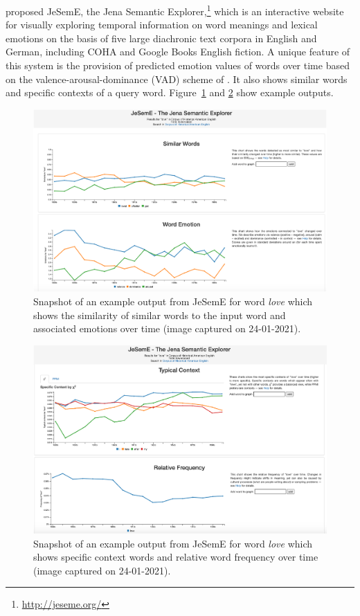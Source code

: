 \documentclass[output=paper%
]{langsci/langscibook}
\begin{document}
\citet{jeseme} proposed JeSemE, the Jena Semantic Explorer,\footnote{\url{http://jeseme.org/}} which is an interactive website for visually exploring temporal information on word meanings and lexical emotions on the basis of five large diachronic text corpora in English and German, including COHA and Google Books English fiction. A unique feature of this system is the provision of predicted emotion values of words over time based on the valence-arousal-dominance (VAD) scheme of \cite{bradley1994measuring}. It also shows similar words and specific contexts of a query word. Figure~\ref{fig:jeseme1} and \ref{fig:jeseme2} show example outputs.

\begin{figure}
	\includegraphics[width=.9\textwidth]{figures/JATOWT_Jeseme1.png}
        \caption{Snapshot of an example output from JeSemE for word \textit{love} which shows the similarity of similar words to the input word and associated emotions over time (image captured on 24-01-2021).\label{fig:jeseme1}}
\end{figure}

\begin{figure}
	\includegraphics[width=.9\textwidth]{figures/JATOWT_Jeseme2.png}
        \caption{Snapshot of an example output from JeSemE for word \textit{love}  which shows specific context words and relative word frequency over time (image captured on 24-01-2021).\label{fig:jeseme2}}
\end{figure}
\end{document}
